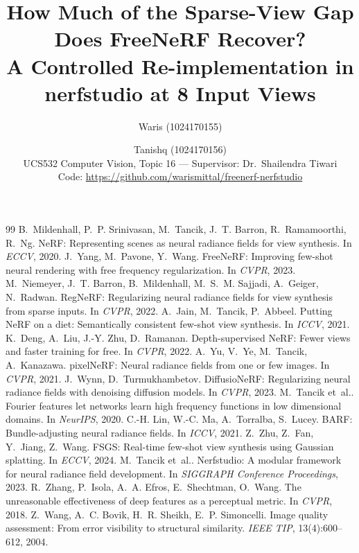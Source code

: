 \documentclass[10pt,twocolumn,letterpaper]{article}
\title{\Large\bfseries How Much of the Sparse-View Gap Does FreeNeRF Recover?\\
\large A Controlled Re-implementation in nerfstudio at 8 Input Views}
\author{Waris (1024170155) \and Tanishq (1024170156)\\
UCS532 Computer Vision, Topic 16 --- Supervisor: Dr.\ Shailendra Tiwari\\
{\small Code: \url{https://github.com/warismittal/freenerf-nerfstudio}}}
\date{}
\newcommand{\etal}{et~al.}
\begin{document}
\maketitle




{\small
\begin{thebibliography}{99}\setlength{\itemsep}{0pt}
 B.~Mildenhall, P.~P. Srinivasan, M.~Tancik, J.~T. Barron, R.~Ramamoorthi, R.~Ng. NeRF: Representing scenes as neural radiance fields for view synthesis. In \emph{ECCV}, 2020.
 J.~Yang, M.~Pavone, Y.~Wang. FreeNeRF: Improving few-shot neural rendering with free frequency regularization. In \emph{CVPR}, 2023.
 M.~Niemeyer, J.~T. Barron, B.~Mildenhall, M.~S.~M. Sajjadi, A.~Geiger, N.~Radwan. RegNeRF: Regularizing neural radiance fields for view synthesis from sparse inputs. In \emph{CVPR}, 2022.
 A.~Jain, M.~Tancik, P.~Abbeel. Putting NeRF on a diet: Semantically consistent few-shot view synthesis. In \emph{ICCV}, 2021.
 K.~Deng, A.~Liu, J.-Y. Zhu, D.~Ramanan. Depth-supervised NeRF: Fewer views and faster training for free. In \emph{CVPR}, 2022.
 A.~Yu, V.~Ye, M.~Tancik, A.~Kanazawa. pixelNeRF: Neural radiance fields from one or few images. In \emph{CVPR}, 2021.
 J.~Wynn, D.~Turmukhambetov. DiffusioNeRF: Regularizing neural radiance fields with denoising diffusion models. In \emph{CVPR}, 2023.
 M.~Tancik \etal. Fourier features let networks learn high frequency functions in low dimensional domains. In \emph{NeurIPS}, 2020.
 C.-H. Lin, W.-C. Ma, A.~Torralba, S.~Lucey. BARF: Bundle-adjusting neural radiance fields. In \emph{ICCV}, 2021.
 Z.~Zhu, Z.~Fan, Y.~Jiang, Z.~Wang. FSGS: Real-time few-shot view synthesis using Gaussian splatting. In \emph{ECCV}, 2024.
 M.~Tancik \etal. Nerfstudio: A modular framework for neural radiance field development. In \emph{SIGGRAPH Conference Proceedings}, 2023.
 R.~Zhang, P.~Isola, A.~A. Efros, E.~Shechtman, O.~Wang. The unreasonable effectiveness of deep features as a perceptual metric. In \emph{CVPR}, 2018.
 Z.~Wang, A.~C. Bovik, H.~R. Sheikh, E.~P. Simoncelli. Image quality assessment: From error visibility to structural similarity. \emph{IEEE TIP}, 13(4):600--612, 2004.
\end{thebibliography}}
\end{document}
